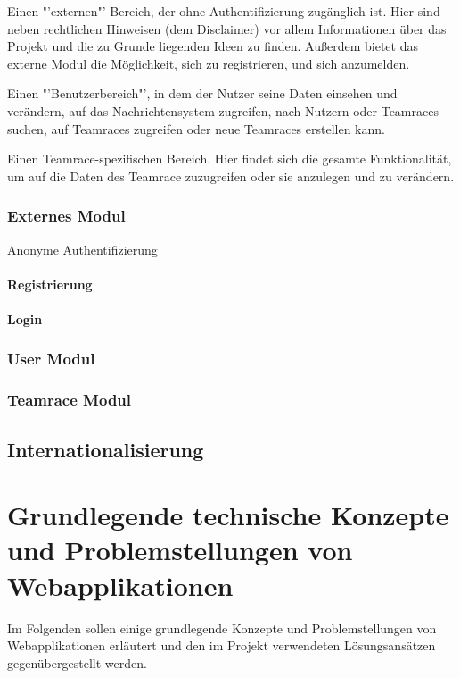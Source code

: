 \documentclass[12pt]{report}
\begin{document}
Einen "'externen"' Bereich, der ohne Authentifizierung zugänglich ist. Hier sind neben rechtlichen Hinweisen (dem Disclaimer) vor allem Informationen über das Projekt und die zu Grunde liegenden Ideen zu finden. Außerdem bietet das externe Modul die Möglichkeit, sich zu registrieren, und sich anzumelden.

Einen "'Benutzerbereich"', in dem der Nutzer seine Daten einsehen und verändern, auf das Nachrichtensystem zugreifen, nach Nutzern oder Teamraces suchen, auf Teamraces zugreifen oder neue Teamraces erstellen kann.

Einen Teamrace-spezifischen Bereich. Hier findet sich die gesamte Funktionalität, um auf die Daten des Teamrace zuzugreifen oder sie anzulegen und zu verändern.

\label{sec:ApplikationsStruktur}

\subsection{Externes Modul}
Anonyme Authentifizierung
\subsubsection{Registrierung}
\subsubsection{Login}

\subsection{User Modul}

\subsection{Teamrace Modul}
\section{Internationalisierung}
\label{sec:Internationalisierung}


\chapter{Grundlegende technische Konzepte und Problemstellungen von Webapplikationen}

Im Folgenden sollen einige grundlegende Konzepte und Problemstellungen von Webapplikationen erläutert und den im Projekt verwendeten Lösungsansätzen gegenübergestellt werden. 
\end{document}
